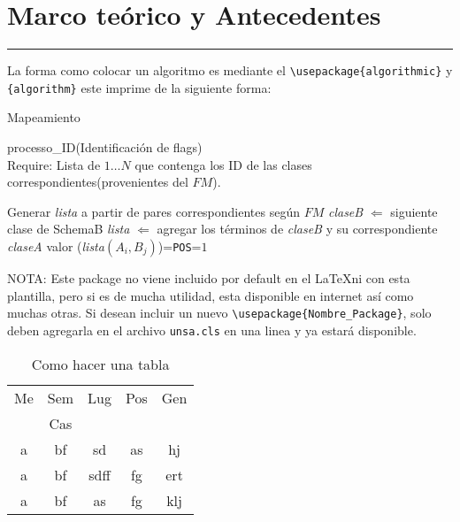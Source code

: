 \chapter{Marco teórico y Antecedentes }
\hrule \bigskip \vspace*{1cm}
La forma como colocar un algoritmo es mediante el
\verb"\usepackage{algorithmic}" y \verb"{algorithm}" este imprime de
la siguiente forma:

\bigskip
\begin{algorithm}
\caption{Mapeamiento}\label{mapeadoEVA} processo\_ID(Identificación de flags)\\
Require: Lista de ${1\ldots N}$ que contenga los ID de las clases
correspondientes(provenientes del $FM$).
\begin{algorithmic} [1]
\STATE Generar \emph{lista} a partir de pares correspondientes según
$FM$ 
\STATE
\emph{claseB} $\Longleftarrow$ siguiente clase de SchemaB \STATE
\emph{lista} $\Longleftarrow$ agregar los términos de \emph{claseB}
y su correspondiente \emph{claseA} \STATE valor
(\emph{lista$(A_{i},B_{j})$})=\verb"POS"=$1$ \ENDIF \ENDWHILE
\end{algorithmic}
\end{algorithm}

NOTA: Este package no viene incluido por default en el \LaTeX ni con
esta plantilla, pero si es de mucha utilidad, esta disponible en
internet así como muchas otras. Si desean incluir un nuevo
\verb"\usepackage{Nombre_Package}", solo deben agregarla en el
archivo \verb"unsa.cls" en una linea y ya estará disponible.

\begin{table}[h]
  \centering
  \begin{tabular}{|c|c|c|c|c|}
  \hline
  Me & Sem & Lug & Pos & Gen\\
   & Cas & & &\\
  \hline
  \hline
  a & bf & sd & as & hj \\
  a & bf & sdff & fg & ert \\
  a & bf & as & fg & klj \\
  \hline
\end{tabular}
  \caption{Como hacer una tabla}\label{tab:demo}
\end{table}



